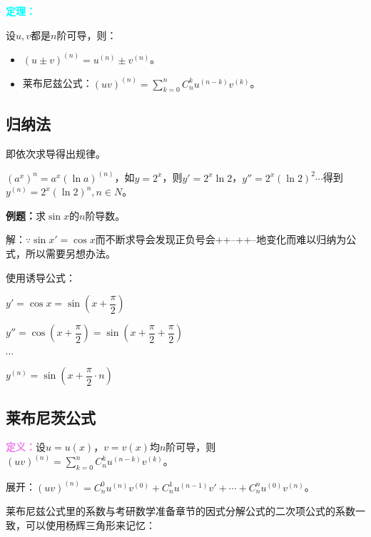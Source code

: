 \documentclass[UTF8, 12pt]{ctexart}
\begin{document}
        \textcolor{aqua}{\textbf{定理：}}

        设$u,v$都是$n$阶可导，则：

        \begin{itemize}
            \item $(u\pm v)^{(n)}=u^{(n)}\pm v^{(n)}$。
            \item 莱布尼兹公式：$(uv)^{(n)}=\sum_{k=0}^nC_n^ku^{(n-k)}v^{(k)}$。
        \end{itemize}

        \subsection{归纳法}

        即依次求导得出规律。

        $(a^x)^n=a^x(\ln a)^{(n)}$，如$y=2^x$，则$y'=2^x\ln 2$，$y''=2^x(\ln 2)^2\cdots$得到$y^{(n)}=2^x(\ln 2)^n,n\in N$。

        \textbf{例题：}求$\sin x$的$n$阶导数。

        解：$\because \sin x'=\cos x$而不断求导会发现正负号会++--++--地变化而难以归纳为公式，所以需要另想办法。

        使用诱导公式：

        $y'=\cos x=\sin(x+\dfrac{\pi}{2})$

        $y''=\cos(x+\dfrac{\pi}{2})=\sin(x+\dfrac{\pi}{2}+\dfrac{\pi}{2})$

        $\cdots$

        $y^{(n)}=\sin(x+\dfrac{\pi}{2}\cdot n)$

        \subsection{莱布尼茨公式}

        \textcolor{violet}{\textbf{定义：}}设$u=u(x)$，$v=v(x)$均$n$阶可导，则$(uv)^{(n)}=\sum_{k=0}^nC_n^ku^{(n-k)}v^{(k)}$。

        展开：$(uv)^{(n)}=C_n^0u^{(n)}v^{(0)}+C_n^1u^{(n-1)}v'+\cdots+C_n^nu^{(0)}v^{(n)}$。

        莱布尼兹公式里的系数与考研数学准备章节的因式分解公式的二次项公式的系数一致，可以使用杨辉三角形来记忆：
\end{document}
